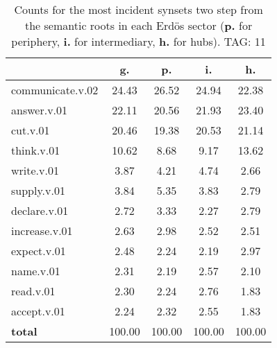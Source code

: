 \begin{table}[h!]
\begin{center}
\begin{tabular}{| l | c | c | c | c |}\hline
 & g. & p. & i. & h. \\\hline
communicate.v.02 & 24.43  & 26.52  & 24.94  & 22.38 \\\hline
answer.v.01 & 22.11  & 20.56  & 21.93  & 23.40 \\\hline
cut.v.01 & 20.46  & 19.38  & 20.53  & 21.14 \\\hline
think.v.01 & 10.62  & 8.68  & 9.17  & 13.62 \\\hline
write.v.01 & 3.87  & 4.21  & 4.74  & 2.66 \\\hline
supply.v.01 & 3.84  & 5.35  & 3.83  & 2.79 \\\hline
declare.v.01 & 2.72  & 3.33  & 2.27  & 2.79 \\\hline
increase.v.01 & 2.63  & 2.98  & 2.52  & 2.51 \\\hline
expect.v.01 & 2.48  & 2.24  & 2.19  & 2.97 \\\hline
name.v.01 & 2.31  & 2.19  & 2.57  & 2.10 \\\hline
read.v.01 & 2.30  & 2.24  & 2.76  & 1.83 \\\hline
accept.v.01 & 2.24  & 2.32  & 2.55  & 1.83 \\\hline
{{\bf total}} & 100.00  & 100.00  & 100.00  & 100.00 \\\hline
\end{tabular}
\caption{Counts for the most incident synsets two step from the semantic roots in each Erd\"os sector ({\bf p.} for periphery, {\bf i.} for intermediary, {\bf h.} for hubs). TAG: 11}
\end{center}
\end{table}